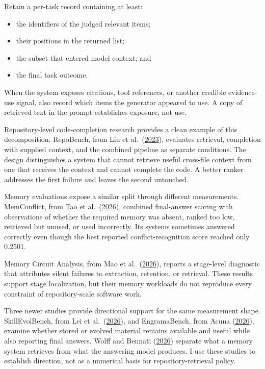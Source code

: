 
Retain a per-task record containing at least:

\begin{itemize}
\tightlist
\item
  the identifiers of the judged relevant items;
\item
  their positions in the returned list;
\item
  the subset that entered model context; and
\item
  the final task outcome.
\end{itemize}

When the system exposes citations, tool references, or another credible evidence-use signal, also record which items the generator appeared to use. A copy of retrieved text in the prompt establishes exposure, not use.

Repository-level code-completion research provides a clean example of this decomposition. RepoBench, from Liu et al.~(\href{https://arxiv.org/abs/2306.03091}{2023}), evaluates retrieval, completion with supplied context, and the combined pipeline as separate conditions. The design distinguishes a system that cannot retrieve useful cross-file context from one that receives the context and cannot complete the code. A better ranker addresses the first failure and leaves the second untouched.

Memory evaluations expose a similar split through different measurements. MemConflict, from Tao et al.~(\href{https://arxiv.org/abs/2605.20926}{2026}), combined final-answer scoring with observations of whether the required memory was absent, ranked too low, retrieved but unused, or used incorrectly. Its systems sometimes answered correctly even though the best reported conflict-recognition score reached only 0.2501.

Memory Circuit Analysis, from Mao et al.~(\href{https://arxiv.org/abs/2605.03354}{2026}), reports a stage-level diagnostic that attributes silent failures to extraction, retention, or retrieval. These results support stage localization, but their memory workloads do not reproduce every constraint of repository-scale software work.

Three newer studies provide directional support for the same measurement shape. SkillEvolBench, from Lei et al.~(\href{https://arxiv.org/abs/2605.24117}{2026}), and EngramaBench, from Acuna (\href{https://arxiv.org/abs/2604.21229}{2026}), examine whether stored or evolved material remains available and useful while also reporting final answers. Wolff and Bennati (\href{https://arxiv.org/abs/2601.07978}{2026}) separate what a memory system retrieves from what the answering model produces. I use these studies to establish direction, not as a numerical basis for repository-retrieval policy.

